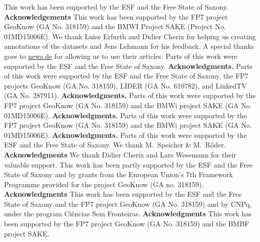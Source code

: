 This work has been supported by the ESF and the Free State of Saxony.
\textbf{Acknowledgements} This work has been supported by the FP7 project GeoKnow (GA No. 318159) and the BMWI Project SAKE (Project No. 01MD15006E).
We thank Luise Erfurth and Didier Cherix for helping us creating annotations of the datasets and Jens Lehmann for his feedback. A special thanks goes to \url{news.de} for allowing us to use their articles. Parts of this work were supported by the ESF and the Free State of Saxony.
\textbf{Acknowledgments.} Parts of this work were supported by the ESF and the Free State of Saxony, the FP7 projects GeoKnow (GA No. 318159), LIDER (GA No. 610782), and LinkedTV (GA No. 287911).
\textbf{Acknowledgments.} Parts of this work were supported by the FP7 project GeoKnow (GA No. 318159) and the BMWi project SAKE (GA No. 01MD15006E). 
\textbf{Acknowledgments.} Parts of this work were supported by the FP7 project GeoKnow (GA No. 318159) and the BMWi project SAKE (GA No. 01MD15006E). 
\textbf{Acknowledgments.} Parts of this work were supported by the ESF and the Free State of Saxony. We thank M.~Speicher \& M.~R\"oder.
\textbf{Acknowledgments} We thank Didier Cherix and Lars Wesemann for their valuable support. This work has been partly supported by the ESF and the Free State of Saxony and by grants from the European Union's 7th Framework Programme provided for the project GeoKnow (GA no. 318159).\\
\textbf{Acknowledgments}
This work has been supported by the ESF and the Free State of Saxony and the FP7 project GeoKnow (GA No. 318159) and by CNPq, under the program Ciências Sem Fronteiras.
\textbf{Acknowledgments}
This work has been supported by the FP7 project GeoKnow (GA No. 318159) and the BMBF project SAKE.

\endgroup



